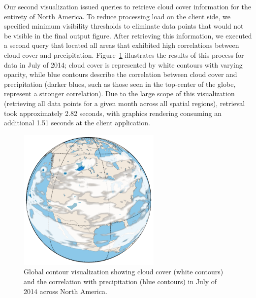 Our second visualization issued queries to retrieve cloud cover information for the entirety of North America. To reduce processing load on the client side, we specified minimum visibility thresholds to eliminate data points that would not be visible in the final output figure. After retrieving this information, we executed a second query that located all areas that exhibited high correlations between cloud cover and precipitation. Figure~\ref{fig:global-contour} illustrates the results of this process for data in July of 2014; cloud cover is represented by white contours with varying opacity, while blue contours describe the correlation between cloud cover and precipitation (darker blues, such as those seen in the top-center of the globe, represent a stronger correlation). Due to the large scope of this visualization (retrieving all data points for a given month across all spatial regions), retrieval took approximately 2.82 seconds, with graphics rendering consuming an additional 1.51 seconds at the client application.

\begin{figure}[h]
    \centerline{\includegraphics[width=2.75in]{figures/globe.pdf}}
    \caption{Global contour visualization showing cloud cover (white contours) and the correlation with precipitation (blue contours) in July of 2014 across North America.}
    \label{fig:global-contour}
\end{figure}
